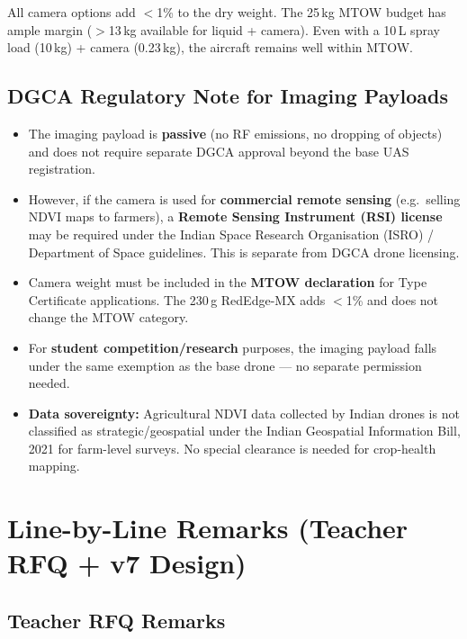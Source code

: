 \documentclass[11pt,a4paper]{article}
\begin{document}
All camera options add $<$1\% to the dry weight. The 25\,kg MTOW budget has ample margin ($>$13\,kg available for liquid + camera). Even with a 10\,L spray load (10\,kg) + camera (0.23\,kg), the aircraft remains well within MTOW.

\subsection{DGCA Regulatory Note for Imaging Payloads}

\begin{itemize}
\item The imaging payload is \textbf{passive} (no RF emissions, no dropping of objects) and does not require separate DGCA approval beyond the base UAS registration.
\item However, if the camera is used for \textbf{commercial remote sensing} (e.g.\ selling NDVI maps to farmers), a \textbf{Remote Sensing Instrument (RSI) license} may be required under the Indian Space Research Organisation (ISRO) / Department of Space guidelines. This is separate from DGCA drone licensing.
\item Camera weight must be included in the \textbf{MTOW declaration} for Type Certificate applications. The 230\,g RedEdge-MX adds $<$1\% and does not change the MTOW category.
\item For \textbf{student competition/research} purposes, the imaging payload falls under the same exemption as the base drone --- no separate permission needed.
\item \textbf{Data sovereignty:} Agricultural NDVI data collected by Indian drones is not classified as strategic/geospatial under the Indian Geospatial Information Bill, 2021 for farm-level surveys. No special clearance is needed for crop-health mapping.
\end{itemize}

\section{Line-by-Line Remarks (Teacher RFQ + v7 Design)}

\subsection{Teacher RFQ Remarks}
\end{document}

